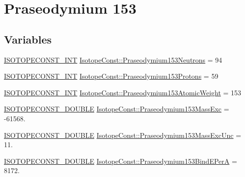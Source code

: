 \hypertarget{group___isotope_const-_praseodymium-_pr153}{}\section{Praseodymium 153}
\label{group___isotope_const-_praseodymium-_pr153}
\subsection*{Variables}
\begin{DoxyCompactItemize}
\item 
\mbox{\hyperlink{group___isotope_const-_macros_ga5f18360b3e99483a35c32d789e62621c}{I\+S\+O\+T\+O\+P\+E\+C\+O\+N\+S\+T\+\_\+\+I\+NT}} \mbox{\hyperlink{group___isotope_const-_praseodymium-_pr153_gad4f99689d3ec5bb560efb1b02fde8f6d}{Isotope\+Const\+::\+Praseodymium153\+Neutrons}} = 94
\item 
\mbox{\hyperlink{group___isotope_const-_macros_ga5f18360b3e99483a35c32d789e62621c}{I\+S\+O\+T\+O\+P\+E\+C\+O\+N\+S\+T\+\_\+\+I\+NT}} \mbox{\hyperlink{group___isotope_const-_praseodymium-_pr153_ga3120173bf69451ed96fcbfaa276170b5}{Isotope\+Const\+::\+Praseodymium153\+Protons}} = 59
\item 
\mbox{\hyperlink{group___isotope_const-_macros_ga5f18360b3e99483a35c32d789e62621c}{I\+S\+O\+T\+O\+P\+E\+C\+O\+N\+S\+T\+\_\+\+I\+NT}} \mbox{\hyperlink{group___isotope_const-_praseodymium-_pr153_ga2938812028d47baa4b341818cd74ad14}{Isotope\+Const\+::\+Praseodymium153\+Atomic\+Weight}} = 153
\item 
\mbox{\hyperlink{group___isotope_const-_macros_ga8f45a7272ce02c0b4c65c44636ed719a}{I\+S\+O\+T\+O\+P\+E\+C\+O\+N\+S\+T\+\_\+\+D\+O\+U\+B\+LE}} \mbox{\hyperlink{group___isotope_const-_praseodymium-_pr153_ga3650bc283dc206c36aa958647eea56e9}{Isotope\+Const\+::\+Praseodymium153\+Mass\+Exc}} = -\/61568.
\item 
\mbox{\hyperlink{group___isotope_const-_macros_ga8f45a7272ce02c0b4c65c44636ed719a}{I\+S\+O\+T\+O\+P\+E\+C\+O\+N\+S\+T\+\_\+\+D\+O\+U\+B\+LE}} \mbox{\hyperlink{group___isotope_const-_praseodymium-_pr153_ga676de66a2ee9cfb7a22a2e1fcc345342}{Isotope\+Const\+::\+Praseodymium153\+Mass\+Exc\+Unc}} = 11.
\item 
\mbox{\hyperlink{group___isotope_const-_macros_ga8f45a7272ce02c0b4c65c44636ed719a}{I\+S\+O\+T\+O\+P\+E\+C\+O\+N\+S\+T\+\_\+\+D\+O\+U\+B\+LE}} \mbox{\hyperlink{group___isotope_const-_praseodymium-_pr153_ga1a632231c4ca102658b536cf25845fb9}{Isotope\+Const\+::\+Praseodymium153\+Bind\+E\+PerA}} = 8172.

\end{DoxyCompactItemize}

